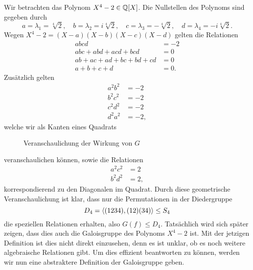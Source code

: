 \documentclass{book}
\begin{document}
\begin{exa}
    \label{exa:d4}
    Wir betrachten das Polynom $X^4 - 2 \in \mathbb{Q}[X]$. Die Nullstellen des
    Polynoms sind gegeben durch
    \[
        a=\lambda_1=\sqrt[4]{2},\quad b=\lambda_2=i\sqrt[4]{2},\quad c=\lambda_3=-\sqrt[4]{2},\quad d=\lambda_4=-i\sqrt[4]{2}.
    \]
    Wegen $X^4 - 2 = (X-a)(X-b)(X-c)(X-d)$ gelten die Relationen
    \begin{align*}
        abcd & = -2\\
        abc + abd + acd + bcd & = 0 \\
        ab + ac + ad + bc + bd + cd & = 0\\
        a + b + c + d & = 0.
    \end{align*}
	Zus\"atzlich gelten 
    \begin{align}
        a^2b^2 & = -2\\
        b^2c^2 & = -2\\
        c^2d^2 & = -2\\
        d^2a^2 & = -2,
    \end{align}
    welche wir als Kanten eines Quadrats 
\begin{figure}[htpb]
    \centering
    \caption{Veranschaulichung der Wirkung von $G$}%
    \label{fig:square}
    \end{figure}
    veranschaulichen können, sowie die Relationen
    \begin{align}
        a^2c^2 & = 2\\
        b^2d^2 & = 2,
    \end{align}
    korrespondierend zu den Diagonalen im Quadrat. Durch diese geometrische
    Veranschaulichung ist klar, dass nur die Permutationen in der Diedergruppe
    \[
        D_4 = \langle  (1234), (12)(34)  \rangle \le S_4
    \]
    die speziellen Relationen erhalten, also $G(f) \le D_4$. Tatsächlich wird
    sich später zeigen, dass dies auch die Galoisgruppe des Polynoms $X^4 -2$
    ist. Mit der jetzigen Definition ist dies nicht direkt einzusehen, denn es ist
    unklar, ob es noch weitere algebraische Relationen gibt. Um dies effizient
    beantworten zu können, werden wir nun eine abstraktere Definition der
    Galoisgruppe geben.
\end{exa}
\end{document}
